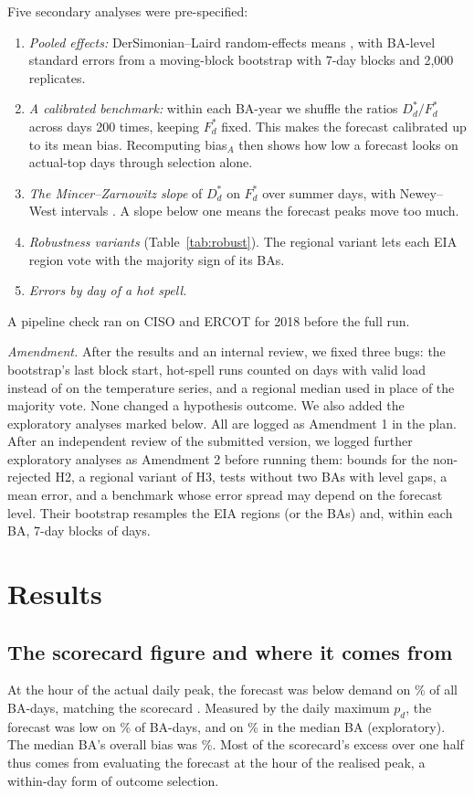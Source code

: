 \documentclass[conference,a4paper]{IEEEtran}
\begin{document}
Five secondary analyses were pre-specified:
\begin{enumerate}
\item \emph{Pooled effects:} DerSimonian--Laird random-effects means \cite{dersimonian1986meta}, with BA-level standard errors from a moving-block bootstrap \cite{kunsch1989jackknife} with 7-day blocks and 2{,}000 replicates.
\item \emph{A calibrated benchmark:} within each BA-year we shuffle the ratios $D^*_d/F^*_d$ across days 200 times, keeping $F^*_d$ fixed. This makes the forecast calibrated up to its mean bias. Recomputing bias$_A$ then shows how low a forecast looks on actual-top days through selection alone.
\item \emph{The Mincer--Zarnowitz slope} of $D^*_d$ on $F^*_d$ over summer days, with Newey--West intervals \cite{newey1987simple}. A slope below one means the forecast peaks move too much.
\item \emph{Robustness variants} (Table~\ref{tab:robust}). The regional variant lets each EIA region vote with the majority sign of its BAs.
\item \emph{Errors by day of a hot spell.}
\end{enumerate}
A pipeline check ran on CISO and ERCOT for 2018 before the full run.

\emph{Amendment.} After the results and an internal review, we fixed three bugs: the bootstrap's last block start, hot-spell runs counted on days with valid load instead of on the temperature series, and a regional median used in place of the majority vote. None changed a hypothesis outcome. We also added the exploratory analyses marked below. All are logged as Amendment 1 in the plan. After an independent review of the submitted version, we logged further exploratory analyses as Amendment 2 before running them: bounds for the non-rejected H2, a regional variant of H3, tests without two BAs with level gaps, a mean error, and a benchmark whose error spread may depend on the forecast level. Their bootstrap resamples the  EIA regions (or the BAs) and, within each BA, 7-day blocks of days.

\section{Results}

\subsection{The scorecard figure and where it comes from}
At the hour of the actual daily peak, the forecast was below demand on \% of all BA-days, matching the scorecard \cite{cardinalgrid2026}. Measured by the daily maximum $p_d$, the forecast was low on \% of BA-days, and on \% in the median BA (exploratory). The median BA's overall bias was \%. Most of the scorecard's excess over one half thus comes from evaluating the forecast at the hour of the realised peak, a within-day form of outcome selection.
\end{document}
